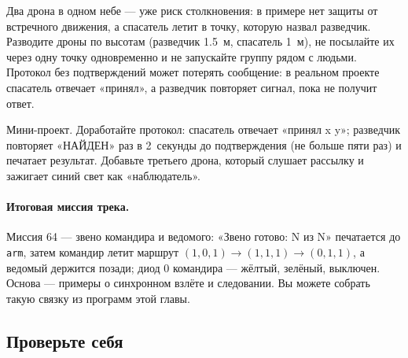 \begin{warnbox}
Два дрона в одном небе --- уже риск столкновения: в примере нет защиты от встречного движения, а спасатель летит в точку, которую назвал разведчик. Разводите дроны по высотам (разведчик 1.5~м, спасатель 1~м), не посылайте их через одну точку одновременно и не запускайте группу рядом с людьми. Протокол без подтверждений может потерять сообщение: в реальном проекте спасатель отвечает «принял», а разведчик повторяет сигнал, пока не получит ответ.
\end{warnbox}

\begin{taskbox}
Мини-проект. Доработайте протокол: спасатель отвечает «принял x y»; разведчик повторяет «НАЙДЕН» раз в 2~секунды до подтверждения (не больше пяти раз) и печатает результат. Добавьте третьего дрона, который слушает рассылку и зажигает синий свет как «наблюдатель».
\end{taskbox}

\paragraph{Итоговая миссия трека.} Миссия 64 --- звено командира и ведомого: «Звено готово: N из N» печатается до \verb|arm|, затем командир летит маршрут $(1,0,1) \to (1,1,1) \to (0,1,1)$, а ведомый держится позади; диод 0 командира --- жёлтый, зелёный, выключен. Основа --- примеры о синхронном взлёте и следовании. Вы можете собрать такую связку из программ этой главы.

\subsection{Проверьте себя}

